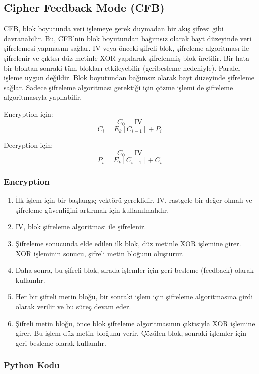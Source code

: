\newpage

\subsection{Cipher Feedback Mode (CFB)}

CFB, blok boyutunda veri işlemeye gerek duymadan bir akış şifresi gibi davranabilir. Bu, CFB'nin blok boyutundan bağımsız olarak bayt düzeyinde veri şifrelemesi yapmasını sağlar. IV veya önceki şifreli blok, şifreleme algoritması ile şifrelenir ve çıktısı düz metinle XOR yapılarak şifrelenmiş blok üretilir. Bir hata bir bloktan sonraki tüm blokları etkileyebilir (geribesleme nedeniyle). Paralel işleme uygun değildir. Blok boyutundan bağımsız olarak bayt düzeyinde şifreleme sağlar. Sadece şifreleme algoritması gerektiği için çözme işlemi de şifreleme algoritmasıyla yapılabilir.

Encryption için:
\[ C_0 = \text{IV} \]
\[ C_i = E_k [C_{i-1}] + P_i \]

Decryption için:
\[ C_0 = \text{IV} \]
\[ P_i = E_k [C_{i-1}] + C_i \]

\subsubsection{Encryption}

\begin{enumerate}
    \item İlk işlem için bir başlangıç vektörü gereklidir. IV, rastgele bir değer olmalı ve şifreleme güvenliğini artırmak için kullanılmalıdır.
    \item IV, blok şifreleme algoritması ile şifrelenir.
    \item Şifreleme sonucunda elde edilen ilk blok, düz metinle XOR işlemine girer. XOR işleminin sonucu, şifreli metin bloğunu oluşturur.
    \item Daha sonra, bu şifreli blok, sırada işlemler için geri besleme (feedback) olarak kullanılır.
    \item Her bir şifreli metin bloğu, bir sonraki işlem için şifreleme algoritmasına girdi olarak verilir ve bu süreç devam eder.
    \item Şifreli metin bloğu, önce blok şifreleme algoritmasının çıktısıyla XOR işlemine girer. Bu işlem düz metin bloğunu verir. Çözülen blok, sonraki işlemler için geri besleme olarak kullanılır.
\end{enumerate}

\subsubsection{Python Kodu}

